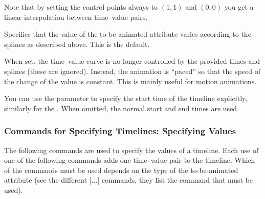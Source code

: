 \begin{command}{\pgfsys@animation@time{}}
  Note that by setting the control points always to $(1,1)$ and
  $(0,0)$ you get a linear interpolation between time--value pairs.

  \begin{command}{\pgfsys@animation@spline}
    Specifies that the value of the to-be-animated attribute varies
    according to the splines as described above. This is the default.
\begin{codeexample}[width=2cm]
\end{codeexample}
  \end{command}

  \begin{command}{\pgfsys@animation@paced{}}
    When set, the time--value curve is no longer controlled by the
    provided times and splines (these are ignored). Instead, the
    animation is ``paced'' so that the speed of the change of the
    value is constant. This is mainly useful for motion animations.

    You can use the  parameter to specify the start
    time of the timeline explicitly, similarly for the . When omitted, the normal start and end times are used.
\begin{codeexample}[width=2cm]
\end{codeexample}
  \end{command}
 
\end{command}


\subsubsection{Commands for Specifying Timelines: Specifying Values}

The following commands are used to specify the values of a
timeline. Each use of one of the following commands adds one
time--value pair to the timeline. Which of the commands must be used
depends on the type of the to-be-animated attribute (see the different
|\pgfsys@animate...| commands, they list the command that must be
used). 


